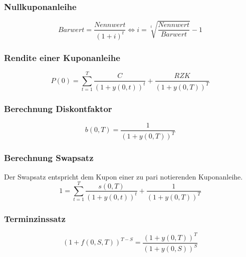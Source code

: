 \subsubsection{Nullkuponanleihe}
\[Barwert = \frac{Nennwert}{(1+i)^t} \iff i = \sqrt[t]{\frac{Nennwert}{Barwert}} -1\]

\subsubsection{Rendite einer Kuponanleihe}
\[P(0) = \sum_{t=1}^{T} \frac{C}{(1+y(0,t))^t} + \frac{RZK}{(1+y(0,T))^T}\]

\subsubsection{Berechnung Diskontfaktor}
\[b(0,T) = \frac{1}{(1+y(0,T))^T}\]

\subsubsection{Berechnung Swapsatz}
Der Swapsatz entspricht dem Kupon einer zu pari notierenden Kuponanleihe.
\[1 = \sum_{t=1}^{T} \frac{s(0,T)}{(1+y(0,t))^t} + \frac{1}{(1+y(0,T))^T}\]

\subsubsection{Terminzinssatz}
\[(1+f(0,S,T))^{T-S} = \frac{(1+y(0,T))^T}{(1+y(0,S))^S}\]

